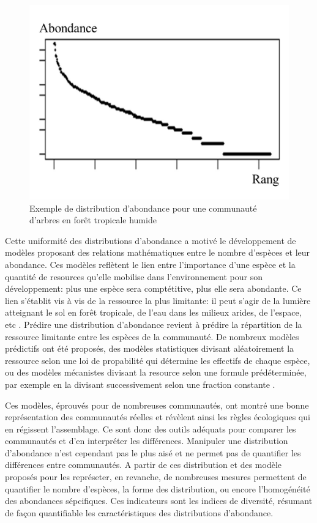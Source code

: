 \documentclass[
  11pt,
  french,
  A4paper,
  extrafontsizes,onecolumn,openright
  ]{memoir}
\begin{document}
\begin{figure}

{\centering \includegraphics[width=0.6\linewidth]{ExternalFig/SpeciesAbdDist} 

}

\caption{Exemple de distribution d'abondance pour une communauté d'arbres en forêt tropicale humide}\label{fig:AbdDist}
\end{figure}

Cette uniformité des distributions d'abondance a motivé le développement
de modèles proposant des relations mathématiques entre le nombre
d'espèces et leur abondance. Ces modèles reflètent le lien entre
l'importance d'une espèce et la quantité de resources qu'elle mobilise
dans l'environnement pour son développement: plus une espèce sera
comptétitive, plus elle sera abondante. Ce lien s'établit vis à vis de
la ressource la plus limitante: il peut s'agir de la lumière atteignant
le sol en forêt tropicale, de l'eau dans les milieux arides, de
l'espace, etc \autocites{findref}[ dans
Asner2004spatial-and-temporal]{Johns1996}. Prédire une distribution
d'abondance revient à prédire la répartition de la ressource limitante
entre les espèces de la communauté. De nombreux modèles prédictifs ont
été proposés, des modèles statistiques divisant aléatoirement la
ressource selon une loi de propabilité qui détermine les effectifs de
chaque espèce, ou des modèles mécanistes divisant la resource selon une
formule prédéterminée, par exemple en la divisant successivement selon
une fraction constante
\autocites{Fisher1943}{Motomura1932}{Tokeshi1993}{Magurran1988}.

Ces modèles, éprouvés pour de nombreuses communautés, ont montré une
bonne représentation des communautés réelles et révèlent ainsi les
règles écologiques qui en régissent l'assemblage. Ce sont donc des
outils adéquats pour comparer les communautés et d'en interpréter les
différences. Manipuler une distribution d'abondance n'est cependant pas
le plus aisé et ne permet pas de quantifier les différences entre
communautés. A partir de ces distribution et des modèle proposés pour
les représeter, en revanche, de nombreuses mesures permettent de
quantifier le nombre d'espèces, la forme des distribution, ou encore
l'homogénéité des abondances sépcifiques. Ces indicateurs sont les
indices de diversité, résumant de façon quantifiable les
caractéristiques des distributions d'abondance.
\end{document}

